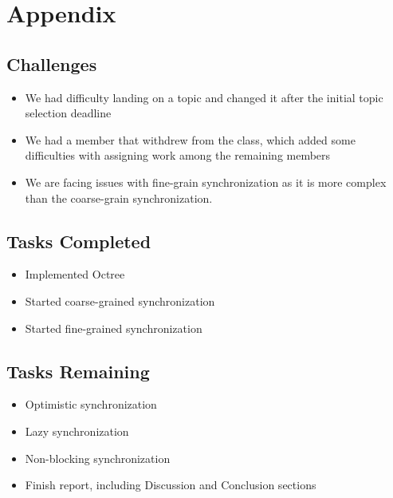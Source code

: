 \documentclass[conference]{IEEEtran}
\begin{document}
\section*{Appendix}
\subsection*{Challenges}
\begin{itemize}
    \item We had difficulty landing on a topic and changed it after the initial topic selection deadline
    \item We had a member that withdrew from the class, which added some difficulties with assigning work among the remaining members
    \item We are facing issues with fine-grain synchronization as it is more complex than the coarse-grain synchronization.
\end{itemize}
\subsection*{Tasks Completed}
\begin{itemize}
    \item Implemented Octree
    \item Started coarse-grained synchronization
    \item Started fine-grained synchronization
\end{itemize}
    
\subsection*{Tasks Remaining}
\begin{itemize}
    \item Optimistic synchronization
    \item Lazy synchronization
    \item Non-blocking synchronization
    \item Finish report, including Discussion and Conclusion sections
\end{itemize}

{}

\end{document}

